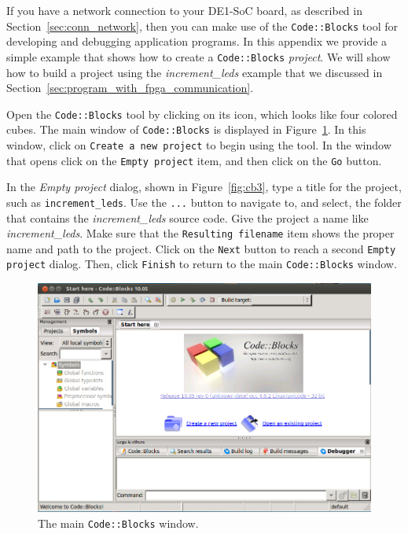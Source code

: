 \documentclass[11pt, twoside, pdftex]{article}
\begin{document}
If you have a network connection to your DE1-SoC board, as described in
Section~\ref{sec:conn_network}, then you can make use of the \texttt{Code::Blocks} tool for
developing and debugging application programs. In this appendix we provide a simple example 
that shows how to create a \texttt{Code::Blocks} {\it project}.
We will show how to build a project using the {\it increment\_leds} example that we discussed in
Section~\ref{sec:program_with_fpga_communication}.

Open the \texttt{Code::Blocks} tool by clicking on its icon, which looks like four colored
cubes. The main window of \texttt{Code::Blocks} is displayed in Figure~\ref{fig:cb1}. In this
window, click on \texttt{Create a new project} to begin using the tool. In the window that
opens click on the \texttt{Empty project} item, and then click on the \texttt{Go} button.

In the {\it Empty project} dialog, shown in Figure~\ref{fig:cb3}, type a title for the
project, such as \texttt{increment\_leds}. Use the \texttt{...} button to navigate to, and
select, the folder that contains the {\it increment\_leds} source code. Give the project a
name like {\it increment\_leds}. Make sure that the \texttt{Resulting filename} item shows 
the proper name and path to the project. Click on the \texttt{Next} button to reach a
second \texttt{Empty project} dialog. Then, click \texttt{Finish} to return to the main
\texttt{Code::Blocks} window.

\begin{figure} [h]
\begin{center}
\includegraphics[scale = .60]{figures/cb1.png}
\end{center}
\caption{The main \texttt{Code::Blocks} window.}
\label{fig:cb1}
\end{figure}
\end{document}
